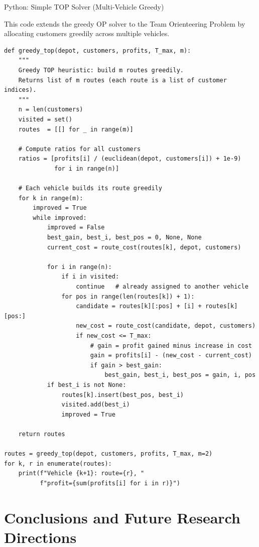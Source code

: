 \documentclass[aspectratio=169,10pt]{beamer}
\begin{document}
\begin{frame}[fragile]{Python: Simple TOP Solver (Multi-Vehicle Greedy)}

  This code extends the greedy OP solver to the Team Orienteering Problem
  by allocating customers greedily across multiple vehicles.

\begin{lstlisting}
def greedy_top(depot, customers, profits, T_max, m):
    """
    Greedy TOP heuristic: build m routes greedily.
    Returns list of m routes (each route is a list of customer indices).
    """
    n = len(customers)
    visited = set()
    routes  = [[] for _ in range(m)]

    # Compute ratios for all customers
    ratios = [profits[i] / (euclidean(depot, customers[i]) + 1e-9)
              for i in range(n)]

    # Each vehicle builds its route greedily
    for k in range(m):
        improved = True
        while improved:
            improved = False
            best_gain, best_i, best_pos = 0, None, None
            current_cost = route_cost(routes[k], depot, customers)

            for i in range(n):
                if i in visited:
                    continue   # already assigned to another vehicle
                for pos in range(len(routes[k]) + 1):
                    candidate = routes[k][:pos] + [i] + routes[k][pos:]
                    new_cost = route_cost(candidate, depot, customers)
                    if new_cost <= T_max:
                        # gain = profit gained minus increase in cost
                        gain = profits[i] - (new_cost - current_cost)
                        if gain > best_gain:
                            best_gain, best_i, best_pos = gain, i, pos
            if best_i is not None:
                routes[k].insert(best_pos, best_i)
                visited.add(best_i)
                improved = True

    return routes

routes = greedy_top(depot, customers, profits, T_max, m=2)
for k, r in enumerate(routes):
    print(f"Vehicle {k+1}: route={r}, "
          f"profit={sum(profits[i] for i in r)}")
\end{lstlisting}

\end{frame}

\section{Conclusions and Future Research Directions}
\end{document}
